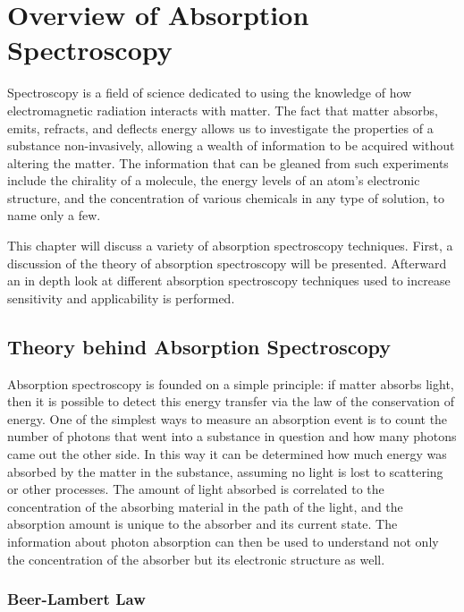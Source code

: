 \chapter{Overview of Absorption Spectroscopy}\label{ch:overview}

Spectroscopy is a field of science dedicated to using the knowledge of how
electromagnetic radiation interacts with matter. The fact that matter absorbs,
emits, refracts, and deflects energy allows us to investigate the properties
of a substance non-invasively, allowing a wealth of information to be acquired
without altering the matter. The information that can be gleaned from such
experiments include the chirality of a molecule, the energy levels of an
atom's electronic structure, and the concentration of various chemicals in any
type of solution, to name only a few.

This chapter will discuss a variety of absorption spectroscopy techniques.
First, a discussion of the theory of absorption spectroscopy will be
presented. Afterward an in depth look at different absorption spectroscopy
techniques used to increase sensitivity and applicability is performed.



\section{Theory behind Absorption Spectroscopy}\label{sec:abs_theory}

Absorption spectroscopy is founded on a simple principle: if matter absorbs
light, then it is possible to detect this energy transfer via the law of the
conservation of energy. One of the simplest ways to measure an absorption
event is to count the number of photons that went into a substance in question
and how many photons came out the other side. In this way it can be determined
how much energy was absorbed by the matter in the substance, assuming no light
is lost to scattering or other processes. The amount of light absorbed is
correlated to the concentration of the absorbing material in the path of the
light, and the absorption amount is unique to the absorber and its current
state. The information about photon absorption can then be used to understand
not only the concentration of the absorber but its electronic structure as
well.



\subsection{Beer-Lambert Law}\label{subsec:beer}


